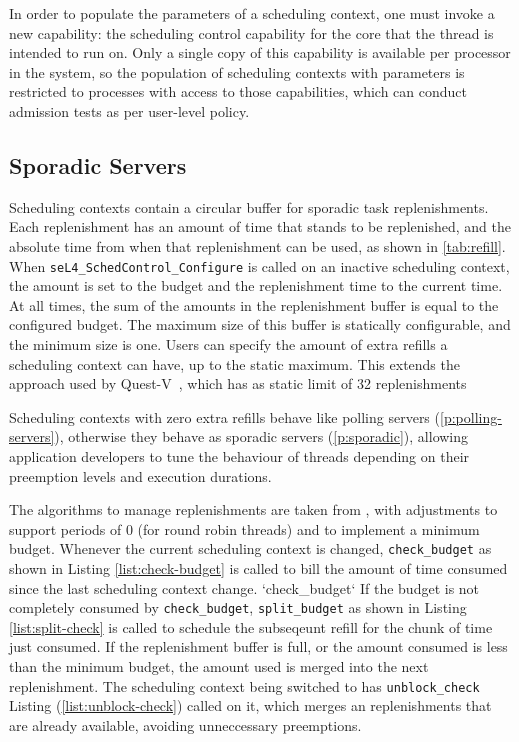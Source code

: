 In order to populate the parameters of a scheduling context, one must invoke a new capability: the scheduling control capability for the core that the thread is intended to run on.
Only a single copy of this capability is available per processor in the system, so the population of scheduling contexts with parameters is restricted to processes with access to those capabilities, which can conduct admission tests as per user-level policy.

\subsection{Sporadic Servers}
\label{sec:impl-sporadic}

Scheduling contexts contain a circular buffer for sporadic task replenishments.
Each replenishment has an amount of time that stands to be replenished, and the absolute time from when that replenishment can be used, as shown in \cref{tab:refill}.
When \texttt{seL4\_SchedControl\_Configure} is called on an inactive scheduling context, the amount is set to the budget and the replenishment time to the current time.
At all times, the sum of the amounts in the replenishment buffer is equal to the configured budget.
The maximum size of this buffer is statically configurable, and the minimum size is one.
Users can specify the amount of extra refills a scheduling context can have, up to the static maximum.
This extends the approach used by Quest-V~\citep{Danish_LW_11}, which has as static limit of 32
replenishments %


Scheduling contexts with zero extra refills behave like polling servers (\cref{p:polling-servers}), otherwise they behave as sporadic servers (\cref{p:sporadic}), allowing application developers to tune the behaviour of threads depending on their preemption levels and execution durations.

The algorithms to manage replenishments are taken from \citet{Danish_LW_11}, with adjustments to support periods of 0 (for round robin threads) and to implement a minimum budget.
Whenever the current scheduling context is changed, \texttt{check\_budget} as shown in Listing \ref{list:check-budget} is called to bill the amount of time consumed since the last scheduling context change.
`check\_budget`
If the budget is not completely consumed by \texttt{check\_budget}, \texttt{split\_budget} as shown in Listing \ref{list:split-check} is called to schedule the subseqeunt refill for the chunk of time just consumed.
If the replenishment buffer is full, or the amount consumed is less than the minimum budget, the amount used is merged into the next replenishment.
The scheduling context being switched to has \texttt{unblock\_check} Listing (\ref{list:unblock-check}) called on it, which merges an replenishments that are already available, avoiding unneccessary preemptions.

